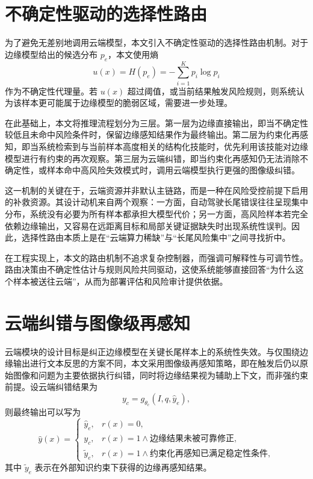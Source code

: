 \section{不确定性驱动的选择性路由}
\label{sec:method-routing}

为了避免无差别地调用云端模型，本文引入不确定性驱动的选择性路由机制。对于边缘模型给出的候选分布 $p_e$，本文使用熵
\begin{equation}
  u(x)=H(p_e)=-\sum_{i=1}^{K} p_i \log p_i
\end{equation}
作为不确定性代理量。若 $u(x)$ 超过阈值，或当前结果触发风险规则，则系统认为该样本更可能属于边缘模型的脆弱区域，需要进一步处理。

在此基础上，本文将推理流程划分为三层。第一层为边缘直接输出，即当不确定性较低且未命中风险条件时，保留边缘感知结果作为最终输出。第二层为约束化再感知，即当系统检索到与当前样本高度相关的结构化技能时，优先利用该技能对边缘模型进行有约束的再次观察。第三层为云端纠错，即当约束化再感知仍无法消除不确定性，或样本命中高风险失效模式时，调用云端模型执行更强的图像级纠错。

这一机制的关键在于，云端资源并非默认主链路，而是一种在风险受控前提下启用的补救资源。其设计动机来自两个观察：一方面，自动驾驶长尾错误往往呈现集中分布，系统没有必要为所有样本都承担大模型代价；另一方面，高风险样本若完全依赖边缘输出，又容易在远距离目标和局部关键证据缺失时出现系统性误判。因此，选择性路由本质上是在“云端算力稀缺”与“长尾风险集中”之间寻找折中。

在工程实现上，本文的路由机制不追求复杂控制器，而强调可解释性与可调节性。路由决策由不确定性估计与规则风险共同驱动，这使系统能够直接回答“为什么这个样本被送往云端”，从而为部署评估和风险审计提供依据。

\section{云端纠错与图像级再感知}
\label{sec:method-cloud}

云端模块的设计目标是纠正边缘模型在关键长尾样本上的系统性失效。与仅围绕边缘输出进行文本反思的方案不同，本文采用图像级再感知策略，即在触发后仍以原始图像和问题为主要依据执行纠错，同时将边缘结果视为辅助上下文，而非强约束前提。设云端纠错结果为
\begin{equation}
  y_c = g_{\theta_c}(I,q,\hat{y}_e),
\end{equation}
则最终输出可以写为
\begin{equation}
  \hat{y}(x)=
  \begin{cases}
    \hat{y}_e, & r(x)=0,\\
    y_c, & r(x)=1 \land \text{边缘结果未被可靠修正},\\
    \tilde{y}_e, & r(x)=1 \land \text{约束化再感知已满足稳定性条件},
  \end{cases}
\end{equation}
其中 $\tilde{y}_e$ 表示在外部知识约束下获得的边缘再感知结果。

